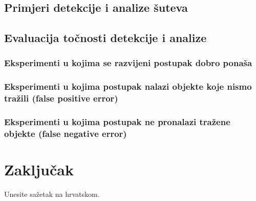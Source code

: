 \documentclass[zavrsnirad]{fer}
\begin{document}
\section{Primjeri detekcije i analize šuteva}
\label{pog:primjeri_detekcije_i_analize_suteva}
\section{Evaluacija točnosti detekcije i analize}
\label{pog:evaluacija_tocnosti_detekcije_i_analize}
\subsection{Eksperimenti u kojima se razvijeni postupak dobro ponaša}
\label{pog:eksperimenti_u_kojima_se_razvijeni_postupak_dobro_ponasa}
\subsection{Eksperimenti u kojima postupak nalazi objekte koje nismo tražili (false positive error)}
\label{pog:eksperimenti_u_kojima_postupak_nalazi_objekte_koje_nismo_trazili}

\subsection{Eksperimenti u kojima postupak ne pronalazi tražene objekte (false negative error)}
\label{pog:eksperimenti_u_kojima_postupak_ne_pronalazi_trazene_objekte}


\chapter{Zaključak}
\label{pog:zakljucak}

\blindtext








\begin{sazetak}
  Unesite sažetak na hrvatskom.

  \blindtext
\end{sazetak}
\end{document}
